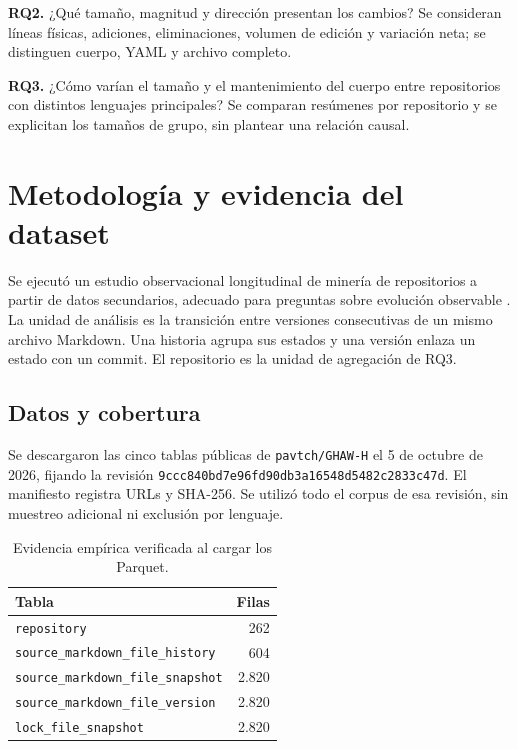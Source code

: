 \documentclass[conference,a4paper]{IEEEtran}
\newcommand{\corr}[1]{{\color{correccion}#1}}
\begin{document}
\corr{\textbf{RQ2.} ¿Qué tamaño, magnitud y dirección presentan los cambios?} Se consideran líneas físicas, adiciones, eliminaciones, volumen de edición y variación neta; se distinguen cuerpo, YAML y archivo completo.

\corr{\textbf{RQ3.} ¿Cómo varían el tamaño y el mantenimiento del cuerpo entre repositorios con distintos lenguajes principales?} Se comparan resúmenes por repositorio y se explicitan los tamaños de grupo, sin plantear una relación causal.

\clearpage
\section{Metodología y evidencia del dataset}
Se ejecutó un estudio observacional longitudinal de minería de repositorios a partir de datos secundarios, adecuado para preguntas sobre evolución observable \cite{easterbrook2008}. La unidad de análisis es la transición entre versiones consecutivas de un mismo archivo Markdown. Una historia agrupa sus estados y una versión enlaza un estado con un commit. El repositorio es la unidad de agregación de RQ3.

\subsection{Datos y cobertura}
Se descargaron las cinco tablas públicas de \texttt{pavtch/GHAW-H} \cite{ghawh} el 5 de octubre de 2026, fijando la revisión \nolinkurl{9ccc840bd7e96fd90db3a16548d5482c2833c47d}. El manifiesto registra URLs y SHA-256. Se utilizó todo el corpus de esa revisión, sin muestreo adicional ni exclusión por lenguaje.

\begin{table}[!ht]
\centering
\caption{Evidencia empírica verificada al cargar los Parquet.}
\label{tab:dataset}
\footnotesize
\setlength{\tabcolsep}{3pt}
\begin{tabular}{lr}
\toprule
Tabla & Filas\\
\midrule
\texttt{repository} & 262\\
\texttt{source\_markdown\_file\_history} & 604\\
\texttt{source\_markdown\_file\_snapshot} & 2.820\\
\texttt{source\_markdown\_file\_version} & 2.820\\
\texttt{lock\_file\_snapshot} & 2.820\\
\bottomrule
\end{tabular}
\end{table}
\end{document}
